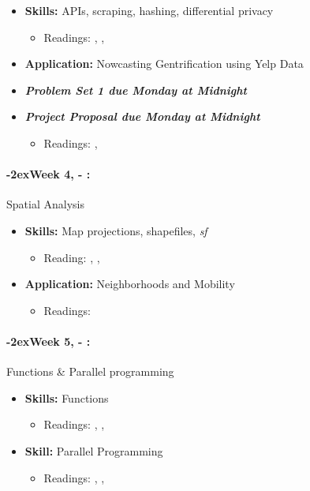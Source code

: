 \documentclass[11pt]{article}
\newcommand{\week}[1]{%
  \paragraph*{\kern-2ex\quad #1, \AdvanceDate[1]\syldate{\today} - \AdvanceDate[2]\syldate{\today}:}%
  \ifdim\wd1=\wd\MONDAY
    \AdvanceDate[7]
  \else
    \AdvanceDate[7]
  \fi%
}
\begin{document}
\begin{itemize}
\item \textbf{Skills:} APIs, scraping, hashing, differential privacy
\begin{itemize}
  \item Readings: \textbf{\cite{chetty2019privacy}}, \cite{abowd2019privacy}, \cite{apiintro}
\end{itemize}
\item \textbf{Application:} Nowcasting Gentrification using Yelp Data
\item \textit{\textbf{Problem Set 1 due Monday at Midnight}}
\item \textit{\textbf{Project Proposal due Monday at Midnight}}
\begin{itemize}
  \item Readings: \textbf{\cite{glaeser2018gentrification}}, \cite{glaeser2017local}
\end{itemize}
\end{itemize} 
\week{Week 4} Spatial Analysis
\begin{itemize}
  \item \textbf{Skills:} Map projections, shapefiles, \textit{sf}
  \begin{itemize}
    \item Reading: \textbf{\cite{mcdermott2023spatial}}, \cite{crs}, \cite{lovelace2019geographic}
  \end{itemize}
  \item \textbf{Application:} Neighborhoods and Mobility
  \begin{itemize}
    \item Readings: \textbf{\cite{chetty2018opportunityatlas}}
  \end{itemize}
\end{itemize}
\week{Week 5} Functions \& Parallel programming
\begin{itemize}
  \item \textbf{Skills:} Functions
  \begin{itemize}
    \item Readings: \cite{mcdermott2023functionsintro}, \cite{mcdermott2023functionsadvanced} \cite{wickham2023meta}, \cite{tidyeval}
  \end{itemize}
  \item \textbf{Skill:} Parallel Programming
  \begin{itemize}
    \item Readings: \textbf{\cite{mcdermott2023parallel}}, \cite{eddelbuettel2020parallel}, \cite{mcdermott2023parallel}
  \end{itemize}
\end{itemize}
\end{document}
